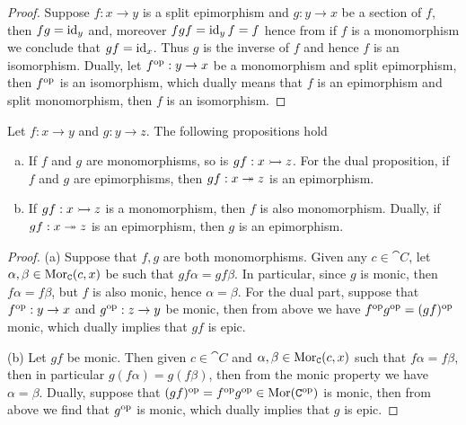 \begin{proof}
  Suppose \(f: x \to y\) is a split epimorphism and \(g: y \to x\) be a section
  of \(f\), then \(f g = \operatorname{id}_y\) and, moreover \(f g f = \operatorname{id}_y
  f = f\) hence from if \(f\) is a monomorphism we conclude that \(g
  f = \operatorname{id}_x\). Thus \(g\) is the inverse of \(f\) and hence \(f\) is an
  isomorphism. Dually, let \(f^{\mathrm{op}}: y \to x\) be a monomorphism and split
  epimorphism, then \(f^{\mathrm{op}}\) is an isomorphism, which dually means that \(f\)
  is an epimorphism and split monomorphism, then \(f\) is an isomorphism.
\end{proof}

\begin{lemma}
  Let \(f: x \to y\) and \(g: y \to z\). The following propositions hold
  \begin{enumerate}[(a).]\setlength\itemsep{0em}
    \item If \(f\) and \(g\) are monomorphisms, so is \(g f: x \rightarrowtail z\).
      For the dual proposition, if \(f\) and \(g\) are epimorphisms, then \(g
      f: x \twoheadrightarrow z\) is an epimorphism.
    \item If \(g f: x \rightarrowtail z\) is a monomorphism, then \(f\) is also
      monomorphism.  Dually, if \(g f: x \twoheadrightarrow z\) is an epimorphism, then
      \(g\) is an epimorphism.
  \end{enumerate}
\end{lemma}

\begin{proof}
  (a) Suppose that \(f, g\) are both monomorphisms. Given any \(c \in \cat C\),
  let \(\alpha, \beta \in \operatorname{Mor}_{\texttt C}(c, x)\) be such that \(g f \alpha = g f
  \beta\). In particular, since \(g\) is monic, then \(f \alpha = f \beta\), but
  \(f\) is also monic, hence \(\alpha = \beta\). For the dual part, suppose that
  \(f^{\mathrm{op}}: y \to x\) and \(g^{\mathrm{op}}: z \to y\) be monic, then from above we have
  \(f^{\mathrm{op}} g^{\mathrm{op}} = (g f)^{\mathrm{op}}\) monic, which dually implies that \(g f\) is epic.

  (b) Let \(g f\) be monic. Then given \(c \in \cat C\) and \(\alpha, \beta \in
  \operatorname{Mor}_{\texttt C}(c, x)\) such that \(f \alpha = f \beta\), then in particular
  \(g(f \alpha) = g(f \beta)\), then from the monic property we have \(\alpha =
  \beta\). Dually, suppose that \((g f)^{\mathrm{op}} = f^{\mathrm{op}} g^{\mathrm{op}} \in \operatorname{Mor}(\texttt C^{\mathrm{op}})\)
  is monic, then from above we find that \(g^{\mathrm{op}}\) is monic, which dually
  implies that \(g\) is epic.
\end{proof}
